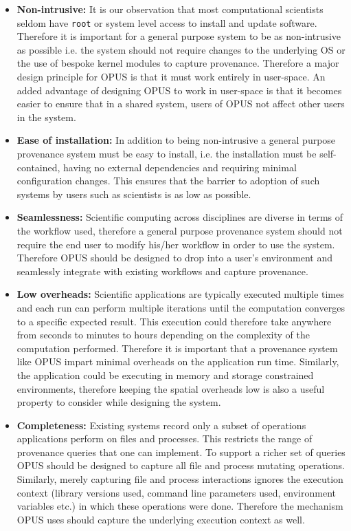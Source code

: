 \documentclass[withindex,glossary]{cam-thesis}
\begin{document}
\begin{itemize}

\item \textbf{Non-intrusive:}
It is our observation that most computational scientists seldom have \texttt{root} or system level access to install and update software. Therefore it is important for a general purpose system to be as non-intrusive as possible i.e. the system should not require changes to the underlying OS or the use of bespoke kernel modules to capture provenance. Therefore a major design principle for OPUS is that it must work entirely in user-space. An added advantage of designing OPUS to work in user-space is that it becomes easier to ensure that in a shared system, users of OPUS not affect other users in the system.

\item \textbf{Ease of installation:}
In addition to being non-intrusive a general purpose provenance system must be easy to install, i.e. the installation must be self-contained, having no external dependencies and requiring minimal configuration changes. This ensures that the barrier to adoption of such systems by users such as scientists is as low as possible.

\item \textbf{Seamlessness:}
Scientific computing across disciplines are diverse in terms of the workflow used, therefore a general purpose provenance system should not require the end user to modify his/her workflow in order to use the system. Therefore OPUS should be designed to drop into a user's environment and seamlessly integrate with existing workflows and capture provenance.

\item \textbf{Low overheads:} 
Scientific applications are typically executed multiple times and each run can perform multiple iterations until the computation converges to a specific expected result. This execution could therefore take anywhere from seconds to minutes to hours depending on the complexity of the computation performed. Therefore it is important that a provenance system like OPUS impart minimal overheads on the application run time. Similarly, the application could be executing in memory and storage constrained environments, therefore keeping the spatial overheads low is also a useful property to consider while designing the system.

\item \textbf{Completeness:} 
Existing systems record only a subset of operations applications perform on files and processes. This restricts the range of provenance queries that one can implement. To support a richer set of queries OPUS should be designed to capture all file and process mutating operations. Similarly, merely capturing file and process interactions ignores the execution context (library versions used, command line parameters used, environment variables etc.) in which these operations were done. Therefore the mechanism OPUS uses should capture the underlying execution context as well. 


\end{itemize}
\end{document}
